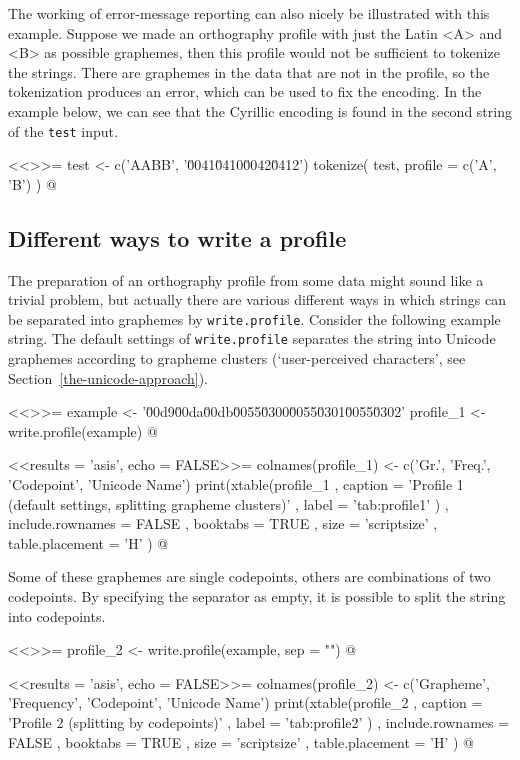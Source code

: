 \noindent The working of error-message reporting can also nicely be illustrated with this
example. Suppose we made an orthography profile with just the Latin <A> and <B> 
as possible graphemes, then this profile would not be sufficient to tokenize the 
strings. There are graphemes in the data that are not in the profile, so the 
tokenization produces an error, which can be used to fix the encoding. In the 
example below, we can see that the Cyrillic encoding is found in the second 
string of the \texttt{test} input.

<<>>=
test <- c('AABB', '\u0041\u0410\u0042\u0412')
tokenize( test, profile = c('A', 'B') )
@

\subsection*{Different ways to write a profile}

The preparation of an orthography profile from some data might sound like a 
trivial problem, but actually there are various different ways in which strings 
can be separated into graphemes by \texttt{write.profile}. Consider the 
following example string. The default settings of \texttt{write.profile} 
separates the string into Unicode graphemes according to grapheme clusters 
(`user-perceived characters', see Section~\ref{the-unicode-approach}).

<<>>=
example <- '\u00d9\u00da\u00db\u0055\u0300\u0055\u0301\u0055\u0302'
profile_1 <- write.profile(example)
@

<<results = 'asis', echo = FALSE>>=
colnames(profile_1) <- c('Gr.', 'Freq.', 'Codepoint', 'Unicode Name')
print(xtable(profile_1
        , caption = 'Profile 1 (default settings, splitting grapheme clusters)'
        , label = 'tab:profile1'
        )
  , include.rownames = FALSE
  , booktabs = TRUE
  , size = 'scriptsize'
  , table.placement = 'H'
  )
@

\noindent Some of these graphemes are single codepoints, others are combinations
of two codepoints. By specifying the separator as empty, it is possible to split
the string into codepoints.

<<>>=
profile_2 <- write.profile(example, sep = "")
@

<<results = 'asis', echo = FALSE>>=
colnames(profile_2) <- c('Grapheme', 'Frequency', 'Codepoint', 'Unicode Name')
print(xtable(profile_2
        , caption = 'Profile 2 (splitting by codepoints)'
        , label = 'tab:profile2'
        )
  , include.rownames = FALSE
  , booktabs = TRUE
  , size = 'scriptsize'
  , table.placement = 'H'
  )
@

